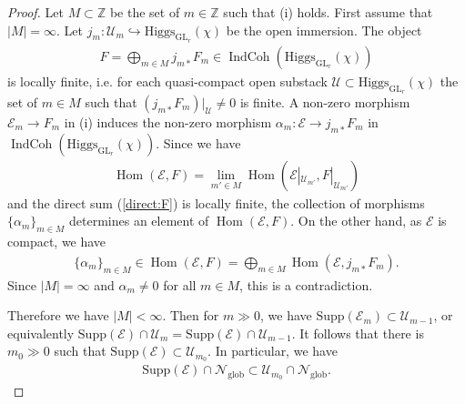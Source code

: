 \documentclass [11pt,oneside,a4paper,mathscr]{amsart}
\theoremstyle{definition}
\newcommand{\IndCoh}{\operatorname{IndCoh}}
\newcommand{\Hom}{\operatorname{Hom}}
\newcommand{\GL}{\operatorname{GL}}
\newcommand{\Hig}{\mathrm{Higgs}}
\begin{document}
\begin{proof}
Let $M\subset \mathbb{Z}$ be the set of $m\in \mathbb{Z}$ such that 
(i) holds. 
First assume that $\lvert M \rvert=\infty$. 
Let $j_m\colon \mathcal{U}_m \hookrightarrow \Hig_{\GL_r}(\chi)$
be the open immersion. The object 
\begin{align}\label{direct:F}
F=
    \bigoplus_{m\in M}j_{m\ast}F_m \in \IndCoh(\Hig_{\GL_r}(\chi))
\end{align}
is locally finite, i.e. for each quasi-compact open substack 
$\mathcal{U} \subset \Hig_{\GL_r}(\chi)$ 
the set of $m\in M$ such that $(j_{m\ast}F_m)|_{\mathcal{U}} \neq 0$ is finite. 
A non-zero morphism $\mathcal{E}_m \to F_m$ in (i) induces 
the non-zero morphism $\alpha_m \colon \mathcal{E} \to j_{m\ast}F_m$
in $\IndCoh(\Hig_{\GL_r}(\chi))$. 
Since we have 
\begin{align*}
    \Hom(\mathcal{E}, F)=
    \lim_{m' \in M} \Hom(\mathcal{E}|_{\mathcal{U}_{m'}}, F|_{\mathcal{U}_{m'}})
\end{align*}
and the direct sum (\ref{direct:F}) is locally finite, 
the collection of morphisms $\{\alpha_m\}_{m\in M}$ determines 
an element of $\Hom(\mathcal{E}, F)$. On the other hand, 
as $\mathcal{E}$ is compact, we have 
\begin{align*}
\{\alpha_m\}_{m\in M}\in 
    \Hom(\mathcal{E}, F)=\bigoplus_{m\in M} \Hom(\mathcal{E}, j_{m*}F_m). 
\end{align*}
Since $\lvert M \rvert=\infty$ and $\alpha_m \neq 0$ for all $m\in M$, 
this is a contradiction. 

Therefore we have $\lvert M \rvert<\infty$. 
Then for $m\gg 0$, we have 
$\mathrm{Supp}(\mathcal{E}_m) \subset \mathcal{U}_{m-1}$, 
or equivalently $\mathrm{Supp}(\mathcal{E})\cap \mathcal{U}_{m}
=\mathrm{Supp}(\mathcal{E})\cap \mathcal{U}_{m-1}$. 
It follows that there is $m_0 \gg 0$ such that 
$\mathrm{Supp}(\mathcal{E}) \subset \mathcal{U}_{m_0}$. 
In particular, we have 
\begin{align}\label{supp:N}
    \mathrm{Supp}(\mathcal{E}) \cap \mathcal{N}_{\mathrm{glob}}\subset 
    \mathcal{U}_{m_0} \cap \mathcal{N}_{\mathrm{glob}}. 
\end{align}


\end{proof}
\end{document}
